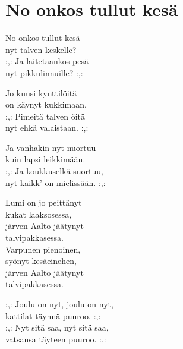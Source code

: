  \section{No onkos tullut kesä}
\vspace{-0.3cm}
No onkos tullut kesä\\
nyt talven keskelle?\\
:,: Ja laitetaankos pesä \\
nyt pikkulinnuille? :,:

Jo kuusi kynttilöitä\\
on käynyt kukkimaan.\\
:,: Pimeitä talven öitä \\
nyt ehkä valaistaan. :,:

Ja vanhakin nyt nuortuu\\
kuin lapsi leikkimään.\\
:,: Ja koukkuselkä suortuu,\\
nyt kaikk' on mielissään. :,:

Lumi on jo peittänyt\\
kukat laaksosessa,\\
järven Aalto jäätynyt \\
talvipakkasessa.\\
Varpunen pienoinen, \\
syönyt kesäeinehen,\\
järven Aalto jäätynyt \\
talvipakkasessa.

:,: Joulu on nyt, joulu on nyt,\\
kattilat täynnä puuroo. :,:\\
:,: Nyt sitä saa, nyt sitä saa,\\
vatsansa täyteen puuroo. :,: